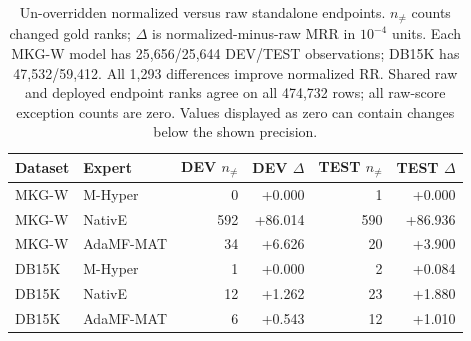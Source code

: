 \begin{table}[htbp]
\centering\footnotesize\setlength{\tabcolsep}{4pt}
\caption{Un-overridden normalized versus raw standalone endpoints. $n_{\ne}$ counts changed gold ranks; $\Delta$ is normalized-minus-raw MRR in $10^{-4}$ units. Each MKG-W model has 25,656/25,644 DEV/TEST observations; DB15K has 47,532/59,412. All 1,293 differences improve normalized RR. Shared raw and deployed endpoint ranks agree on all 474,732 rows; all raw-score exception counts are zero. Values displayed as zero can contain changes below the shown precision.}
\label{tab:endpoint-experts}
\begin{tabular}{llrrrr}
\toprule
Dataset & Expert & DEV $n_{\ne}$ & DEV $\Delta$ & TEST $n_{\ne}$ & TEST $\Delta$\\
\midrule
MKG-W & M-Hyper & 0 & +0.000 & 1 & +0.000\\
MKG-W & NativE & 592 & +86.014 & 590 & +86.936\\
MKG-W & AdaMF-MAT & 34 & +6.626 & 20 & +3.900\\
DB15K & M-Hyper & 1 & +0.000 & 2 & +0.084\\
DB15K & NativE & 12 & +1.262 & 23 & +1.880\\
DB15K & AdaMF-MAT & 6 & +0.543 & 12 & +1.010\\
\bottomrule
\end{tabular}
\end{table}
